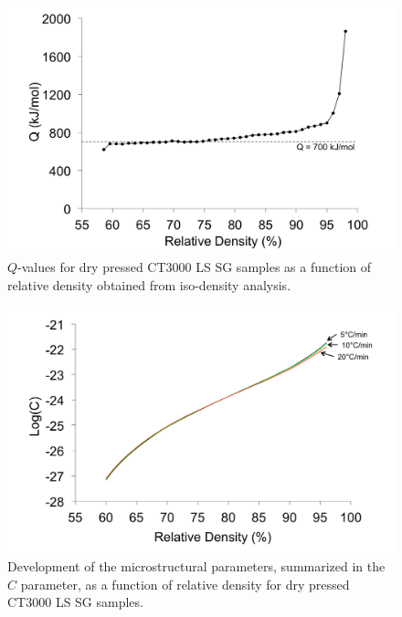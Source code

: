 \newpage
\begin{figure}[H]
	\centering
	\includegraphics[width=\textwidth]{Chapter-6/Figures/Figure8.png}
	\caption{$Q$-values for dry pressed CT3000 LS SG samples as a function of relative density obtained from iso-density analysis.}
	\label{Ch6-figure:Figure8}
\end{figure}

\newpage
\begin{figure}[H]
	\centering
	\includegraphics[width=\textwidth]{Chapter-6/Figures/Figure9.png}
	\caption{Development of the microstructural parameters, summarized in the $C$ parameter, as a function of relative density for dry pressed CT3000 LS SG samples.}
	\label{Ch6-figure:Figure9}
\end{figure}

